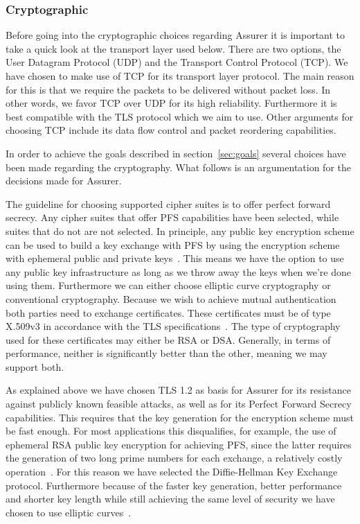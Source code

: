 \subsubsection{Cryptographic}
Before going into the cryptographic choices regarding Assurer it is important to take a quick look at the transport layer used below. There are two options, the User Datagram Protocol (UDP) and the Transport Control Protocol (TCP). We have chosen to make use of TCP for its transport layer protocol. The main reason for this is that we require the packets to be delivered without packet loss. In other words, we favor TCP over UDP for its high reliability. Furthermore it is best compatible with the TLS protocol which we aim to use. Other arguments for choosing TCP include its data flow control and packet reordering capabilities.

In order to achieve the goals described in section~\ref{sec:goals} several choices have been made regarding the cryptography. What follows is an argumentation for the decisions made for Assurer. 

The guideline for choosing supported cipher suites is to offer perfect forward secrecy. Any cipher suites that offer PFS capabilities have been selected, while suites that do not are not selected. In principle, any public key encryption scheme can be used to build a key exchange with PFS by using the encryption scheme with ephemeral public and private keys~\cite{PFS}. This means we have the option to use any public key infrastructure as long as we throw away the keys when we're done using them. Furthermore we can either choose elliptic curve cryptography or conventional cryptography. Because we wish to achieve mutual authentication both parties need to exchange certificates. These certificates must be of type X.509v3 in accordance with the TLS specifications~\cite{tls1.2}. The type of cryptography used for these certificates may either be RSA or DSA. Generally, in terms of performance, neither is significantly better than the other, meaning we may support both. 

As explained above we have chosen TLS 1.2 as basis for Assurer for its resistance against publicly known feasible attacks, as well as for its Perfect Forward Secrecy capabilities. This requires that the key generation for the encryption scheme must be fast enough. For most applications this disqualifies, for example, the use of ephemeral RSA public key encryption for achieving PFS, since the latter requires the generation of two long prime numbers for each exchange, a relatively costly operation~\cite{PFS}. For this reason we have selected the Diffie-Hellman Key Exchange protocol. Furthermore because of the faster key generation, better performance and shorter key length while still achieving the same level of security we have chosen to use elliptic curves~\cite{nsaecc}.

